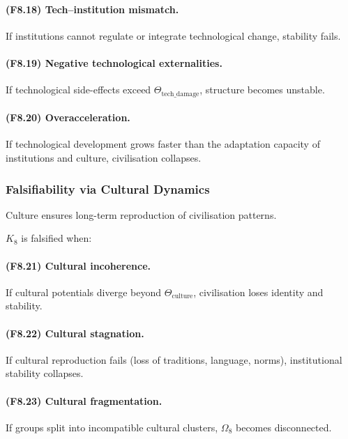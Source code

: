 \paragraph{(F8.18) Tech–institution mismatch.}
If institutions cannot regulate or integrate technological change,
stability fails.

\paragraph{(F8.19) Negative technological externalities.}
If technological side-effects exceed $\Theta_{\mathrm{tech\_damage}}$,
structure becomes unstable.

\paragraph{(F8.20) Overacceleration.}
If technological development grows faster than the adaptation capacity
of institutions and culture, civilisation collapses.



\subsubsection{Falsifiability via Cultural Dynamics}

Culture ensures long-term reproduction of civilisation patterns.

$K_8$ is falsified when:

\paragraph{(F8.21) Cultural incoherence.}
If cultural potentials diverge beyond $\Theta_{\mathrm{culture}}$,
civilisation loses identity and stability.

\paragraph{(F8.22) Cultural stagnation.}
If cultural reproduction fails (loss of traditions, language, norms),
institutional stability collapses.

\paragraph{(F8.23) Cultural fragmentation.}
If groups split into incompatible cultural clusters,
$\Omega_8$ becomes disconnected.

